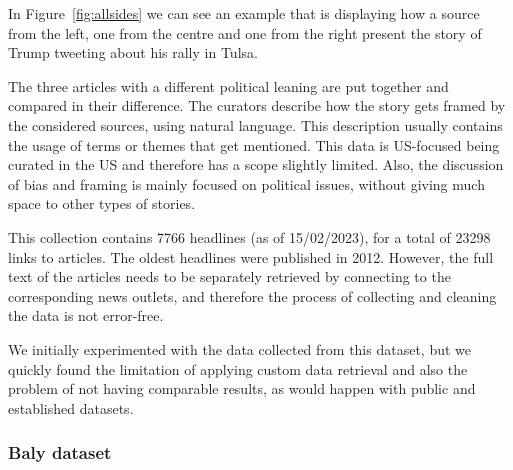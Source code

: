 In Figure~\ref{fig:allsides} we can see an example that is displaying how a source from the left, one from the centre and one from the right present the story of Trump tweeting about his rally in Tulsa.



The three articles with a different political leaning are put together and compared in their difference.
The curators describe how the story gets framed by the considered sources, using natural language.
This description usually contains the usage of terms or themes that get mentioned.
This data is US-focused being curated in the US and therefore has a scope slightly limited. Also, the discussion of bias and framing is mainly focused on political issues, without giving much space to other types of stories.





This collection contains 7766 headlines (as of 15/02/2023), for a total of 23298 links to articles. The oldest headlines were published in 2012.
However, the full text of the articles needs to be separately retrieved by connecting to the corresponding news outlets, and therefore the process of collecting and cleaning the data is not error-free.

We initially experimented with the data collected from this dataset, but we quickly found the limitation of applying custom data retrieval and also the problem of not having comparable results, as would happen with public and established datasets.


\subsubsection{Baly dataset}

